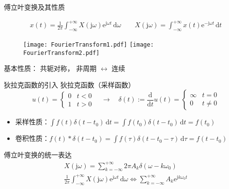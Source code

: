 \documentclass[UTF8]{ctexbeamer}
\begin{document}
\begin{frame}{傅立叶变换及其性质}
    \begin{tcolorbox}[top=0mm,
        title = 傅立叶变换（Fourier Transform）,
        boxrule = 0.3pt,
        fontupper = \normalcolor\small]
        \begin{gather*}
            x(t) = \frac{1}{2\pi} \int_{-\infty}^{+\infty} X(\mathrm{j}\omega) \mathrm{e}^{\mathrm{j}\omega t}\,\mathrm{d}\omega 
            \qquad
            X(\mathrm{j}\omega) = \int_{-\infty}^{+\infty} x(t) \mathrm{e}^{-\mathrm{j}\omega t}\,\mathrm{d}t 
        \end{gather*}
    \end{tcolorbox}
    
    \begin{figure}
        \centering
        \texttt{[image: FourierTransform1.pdf]}
        \hspace{20pt}
        \texttt{[image: FourierTransform2.pdf]}
    \end{figure}

    基本性质：
    共轭对称， 
    非周期 $\leftrightarrow$ 连续
\end{frame}



\begin{frame}{狄拉克函数的引入}
    狄拉克函数（采样函数）
    \begin{equation*}
        u(t) = \left\{\begin{array}{cl}
            0 & t < 0 \\
            1 & t > 0
        \end{array}\right.
        \quad \rightarrow \quad
        \delta (t) := \frac{\mathrm{d}}{\mathrm{d}t} u(t) = \left\{\begin{array}{cl}
            \infty & t = 0 \\
            0 & t \ne 0
        \end{array}\right. 
    \end{equation*}

    \begin{itemize}
        \item 采样性质：$\int f(t) \delta (t-t_0) \, \mathrm{d} t = \int f(t_0) \delta (t-t_0) \, \mathrm{d} t = f(t_0)$
        \item 卷积性质：$f(t) \ast \delta (t-t_0) = \int f(\tau) \delta (t-t_0-\tau) \, \mathrm{d} \tau = f(t-t_0)$
    \end{itemize}

    傅立叶变换的统一表达
    \begin{gather*}
        X(\mathrm{j}\omega) = \sum_{k=-\infty}^{+\infty}  2 \pi A_k \delta (\omega - k\omega_0)\\
        \frac{1}{2\pi} \int_{-\infty}^{+\infty} X(\mathrm{j}\omega) \mathrm{e}^{\mathrm{j}\omega t}\,\mathrm{d}\omega 
        \Leftrightarrow  \sum_{k=-\infty}^{+\infty} A_k \mathrm{e}^{\mathrm{j}k\omega_0t}  
    \end{gather*}
\end{frame}
\end{document}
